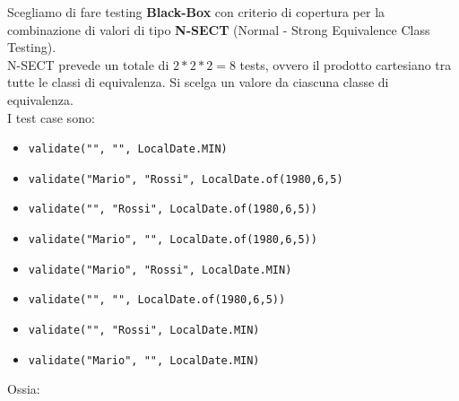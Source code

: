             \noindent Scegliamo di fare testing \textbf{Black-Box} con criterio di copertura per la combinazione di valori di tipo \textbf{N-SECT} (Normal - Strong Equivalence Class Testing).\\
            N-SECT prevede un totale di \(2*2*2 = 8\) tests, ovvero il prodotto cartesiano tra tutte le classi di equivalenza. Si scelga un valore da ciascuna classe di equivalenza. \\
            
            \noindent I test case sono:

            \begin{itemize}
                \item\texttt{validate("", "", LocalDate.MIN)} %
                \item\texttt{validate("Mario", "Rossi", LocalDate.of(1980,6,5)} %
                \item\texttt{validate("", "Rossi", LocalDate.of(1980,6,5))} %
                \item\texttt{validate("Mario", "", LocalDate.of(1980,6,5))} %
                \item\texttt{validate("Mario", "Rossi", LocalDate.MIN)} %
                \item\texttt{validate("", "", LocalDate.of(1980,6,5))} %
                \item\texttt{validate("", "Rossi", LocalDate.MIN)} %
                \item\texttt{validate("Mario", "", LocalDate.MIN)} %
            \end{itemize}

            Ossia:

